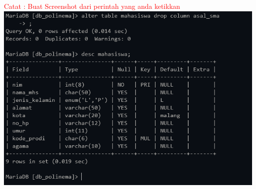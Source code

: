 \documentclass[12pt,titlepage]{article}
\begin{document}
\begin{enumerate}
    \textcolor{red}{Catat : Buat Screenshot dari perintah yang anda ketikkan} \\
    \includegraphics[width=.9\textwidth]{images/figures/practicum-14.PNG}
\end{enumerate}

\newpage
\end{document}
